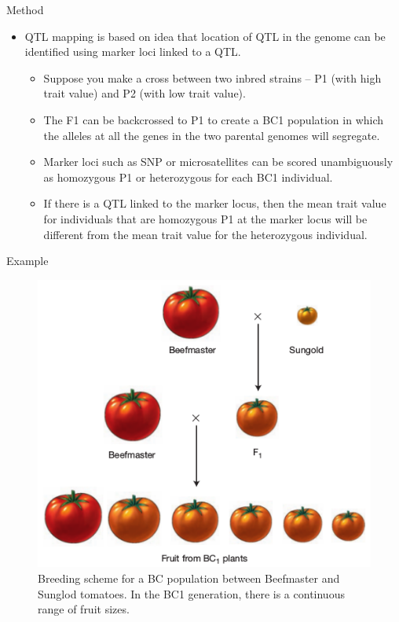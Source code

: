 \documentclass[
  ignorenonframetext,
  aspectratio=169]{beamer}
\providecommand{\tightlist}{%
  \setlength{\itemsep}{0pt}\setlength{\parskip}{0pt}}
\begin{document}
\begin{frame}{Method}
\protect\hypertarget{method}{}
\footnotesize

\begin{itemize}
\tightlist
\item
  QTL mapping is based on idea that location of QTL in the genome can be
  identified using marker loci linked to a QTL.

  \begin{itemize}
  \tightlist
  \item
    Suppose you make a cross between two inbred strains -- P1 (with high
    trait value) and P2 (with low trait value).
  \item
    The F1 can be backcrossed to P1 to create a BC1 population in which
    the alleles at all the genes in the two parental genomes will
    segregate.
  \item
    Marker loci such as SNP or microsatellites can be scored
    unambiguously as homozygous P1 or heterozygous for each BC1
    individual.
  \item
    If there is a QTL linked to the marker locus, then the mean trait
    value for individuals that are homozygous P1 at the marker locus
    will be different from the mean trait value for the heterozygous
    individual.
  \end{itemize}
\end{itemize}
\end{frame}

\begin{frame}{Example}
\protect\hypertarget{example}{}
\begin{figure}
\includegraphics[width=0.3\linewidth]{../images/tomato-beefmaster-sungold-cross} \caption{Breeding scheme for a BC population between Beefmaster and Sunglod tomatoes. In the BC1 generation, there is a continuous range of fruit sizes.}\label{fig:tomato-beefmaster-sungold-cross}
\end{figure}
\end{frame}
\end{document}
